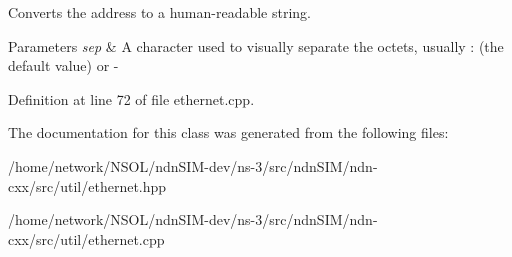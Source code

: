 Converts the address to a human-\/readable string. 


\begin{DoxyParams}{Parameters}
{\em sep} & A character used to visually separate the octets, usually \textquotesingle{}\+:\textquotesingle{} (the default value) or \textquotesingle{}-\/\textquotesingle{} \\
\hline
\end{DoxyParams}


Definition at line 72 of file ethernet.\+cpp.



The documentation for this class was generated from the following files\+:\begin{DoxyCompactItemize}
\item 
/home/network/\+N\+S\+O\+L/ndn\+S\+I\+M-\/dev/ns-\/3/src/ndn\+S\+I\+M/ndn-\/cxx/src/util/ethernet.\+hpp\item 
/home/network/\+N\+S\+O\+L/ndn\+S\+I\+M-\/dev/ns-\/3/src/ndn\+S\+I\+M/ndn-\/cxx/src/util/ethernet.\+cpp\end{DoxyCompactItemize}
